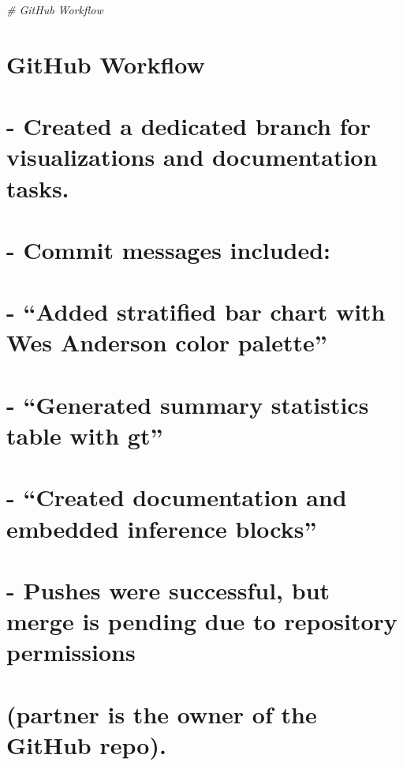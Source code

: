 \documentclass[
]{article}
\newenvironment{Shaded}{\begin{snugshade}}{\end{snugshade}}
\newcommand{\CommentTok}[1]{\textcolor[rgb]{0.56,0.35,0.01}{\textit{#1}}}
\begin{document}
\begin{Shaded}
\begin{Highlighting}[]
\CommentTok{\# GitHub Workflow}
\end{Highlighting}
\end{Shaded}

\section{GitHub Workflow}\label{github-workflow}

\section{- Created a dedicated branch for visualizations and
documentation
tasks.}\label{created-a-dedicated-branch-for-visualizations-and-documentation-tasks.}

\section{- Commit messages included:}\label{commit-messages-included}

\section{- ``Added stratified bar chart with Wes Anderson color
palette''}\label{added-stratified-bar-chart-with-wes-anderson-color-palette}

\section{- ``Generated summary statistics table with
gt''}\label{generated-summary-statistics-table-with-gt}

\section{- ``Created documentation and embedded inference
blocks''}\label{created-documentation-and-embedded-inference-blocks}

\section{- Pushes were successful, but merge is pending due to
repository
permissions}\label{pushes-were-successful-but-merge-is-pending-due-to-repository-permissions}

\section{(partner is the owner of the GitHub
repo).}\label{partner-is-the-owner-of-the-github-repo.}
\end{document}
